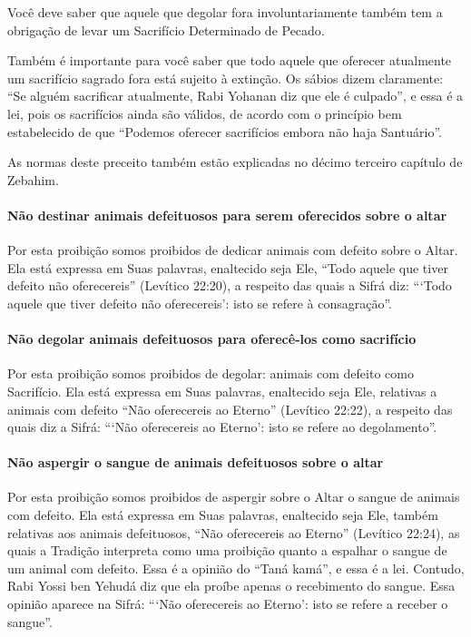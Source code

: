 Você deve saber que aquele que degolar fora involuntariamente também
tem a obrigação de levar um Sacrifício Determinado de Pecado.

Também é importante para você saber que todo aquele que oferecer
atualmente um sacrifício sagrado fora está sujeito à extinção. Os sábios
dizem claramente: ``Se alguém sacrificar atualmente, Rabi Yohanan diz
que ele é culpado'', e essa é a lei, pois os sacrifícios ainda são
válidos, de acordo com o princípio bem estabelecido de que ``Podemos
oferecer sacrifícios embora não haja Santuário''.

As normas deste preceito também estão explicadas no décimo terceiro
capítulo de Zebahim.

\paragraph{Não destinar animais defeituosos para serem oferecidos sobre o altar}

Por esta proibição somos proibidos de dedicar animais com defeito sobre
o Altar. Ela está expressa em Suas palavras, enaltecido seja Ele, ``Todo
aquele que tiver defeito não oferecereis'' (Levítico 22:20), a respeito
das quais a Sifrá diz: ```Todo aquele que tiver defeito não
oferecereis': isto se refere à consagração''.

\paragraph{Não degolar animais defeituosos para oferecê-los como sacrifício}

Por esta proibição somos proibidos de degolar: animais com defeito como
Sacrifício. Ela está expressa em Suas palavras, enaltecido seja Ele,
relativas a animais com defeito ``Não oferecereis ao Eterno'' (Levítico
22:22), a respeito das quais diz a Sifrá: ```Não oferecereis ao Eterno':
isto se refere ao degolamento''.


\paragraph{Não aspergir o sangue de animais defeituosos sobre o altar}

Por esta proibição somos proibidos de aspergir sobre o Altar o sangue
de animais com defeito. Ela está expressa em Suas palavras, enaltecido
seja Ele, também relativas aos animais defeituosos, ``Não oferecereis ao
Eterno'' (Levítico 22:24), as quais a Tradição interpreta como uma
proibição quanto a espalhar o sangue de um animal com defeito. Essa é a
opinião do ``Taná kamá'', e essa é a lei. Contudo, Rabi Yossi ben Yehudá
diz que ela proíbe apenas o recebimento do sangue. Essa opinião aparece
na Sifrá: ```Não oferecereis ao Eterno': isto se refere a receber o
sangue''.

